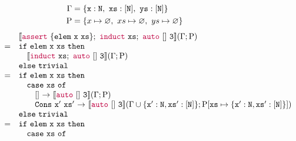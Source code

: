 \begin{figure*}
  \begin{minipage}{\textwidth}
    \begin{align*}
      \Gamma &= \{ \mathtt{x}:\mathtt{N},~ \mathtt{xs}:\mathtt{[N]},~ \mathtt{ys}:\mathtt{[N]} \} \\
      \mathrm{P} &= \{ x \mapsto \varnothing,~ xs \mapsto \varnothing,~ ys \mapsto \varnothing \} 
    \end{align*}
    \begin{align*} \begin{array}{rl}
      & \llbracket  {\color{purple}\ensuremath{\mathtt{assert}}}~\{\mathtt{elem~x~xs}\} ; ~
          {\color{purple}\mathtt{induct}}~\mathtt{xs} ; ~
          {\color{purple}\mathtt{auto}}~\mathtt{[]}~\mathtt{3}
         \rrbracket ( \Gamma ; \mathrm{P} )
      \\ =&
        \mathtt{if}~\mathtt{elem~x~xs}~\mathtt{then}
        \\& \hspace{1em} 
          \llbracket  {\color{purple}\ensuremath{\mathtt{induct}}}~\mathtt{xs} ; ~
              {\color{purple}\mathtt{auto}}~\mathtt{[]}~\mathtt{3}
             \rrbracket ( \Gamma ; \mathrm{P} )
        \\& \mathtt{else}~\mathtt{trivial}
      \\ =&
        \mathtt{if}~\mathtt{elem~x~xs}~\mathtt{then}
        \\& \hspace{1em} 
          \mathtt{case}~\mathtt{xs}~\mathtt{of}
          \\& \hspace{2em}
            \mathtt{[]}~\mathtt{\rightarrow}~
            \llbracket  {\color{purple}\ensuremath{\mathtt{auto}}}~\mathtt{[]}~\mathtt{3}  \rrbracket ( \Gamma ; \mathrm{P} )
            \\& \hspace{2em}
            \mathtt{Cons~x'~xs'}~\mathtt{\rightarrow}~
            \llbracket  {\color{purple}\ensuremath{\mathtt{auto}}}~\mathtt{[]}~\mathtt{3}  \rrbracket ( \Gamma \cup \{\mathtt{x'}:\mathtt{N}, \mathtt{xs'}:\mathtt{[N]}\}; \mathrm{P}[ \mathtt{xs} \mapsto \{ \mathtt{x'}:\mathtt{N}, \mathtt{xs'}:\mathtt{[N]} \} ] )
        \\& \mathtt{else}~\mathtt{trivial}
      \\ =&
        \mathtt{if}~\mathtt{elem~x~xs}~\mathtt{then}
        \\& \hspace{1em} 
          \mathtt{case}~\mathtt{xs}~\mathtt{of}
          \\& \hspace{2em}

\end{array}
\end{align*}
\end{minipage}
\end{figure*}
